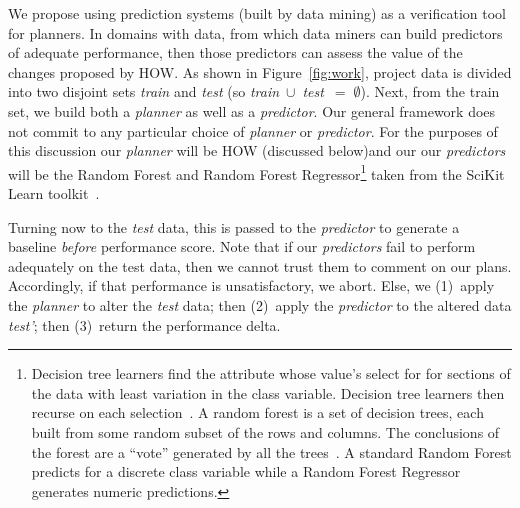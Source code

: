 \documentclass[conference]{IEEEtran}
\newcommand{\fig}[1]{Figure~\ref{fig:#1}}
\begin{document}
{We propose using prediction systems (built by data mining) as a verification
tool for planners. In domains with data, from which data miners can build
predictors of adequate performance, then those predictors can assess the value
of the changes proposed by HOW.
As shown in \fig{work}, 
project data is divided into two disjoint sets {\em train} and {\em test}
(so \mbox{{\em train} $\cup$ {\em test} $=\;\emptyset$}).
Next, from the train set, we build both a {\em planner} as well
as a {\em predictor}. Our general framework does not   commit to any particular  choice
of {\em planner} or {\em predictor}. For the purposes of this discussion 
our {\em planner}
will be HOW (discussed below)and our
our {\em predictors} will be the Random Forest and Random Forest
Regressor\footnote{Decision tree learners find the attribute whose value's
select for for sections of the data with least variation in the class
variable. Decision tree learners then recurse on each selection~\cite{breiman84}. A random forest is a set of decision trees, each built
from some random subset of the rows and columns. The conclusions
of the forest are a ``vote'' generated by all the trees~\cite{Breiman2001}. 
A standard Random Forest predicts for a discrete class variable while
a Random Forest Regressor generates numeric predictions.} taken from the SciKit
Learn toolkit~\cite{Pedregosa2012}.

Turning now to the {\em test} data, this is passed to the {\em predictor}
to generate a baseline {\em before} performance score.
Note that if our {\em predictors} fail to perform adequately on the test data,
then we cannot trust them to comment on our plans. Accordingly,
if that performance is unsatisfactory, we abort.
Else, we (1)~apply the {\em planner} to alter the {\em test} data;
then (2)~apply the {\em predictor} to the altered data {\em test'};
then (3)~return the performance delta.





}
\end{document}
